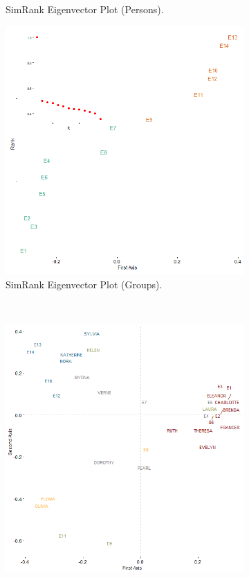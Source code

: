 \documentclass[a4paper,fleqn]{cas-sc}
\begin{document}
\begin{figure}
\begin{subfigure}[b]{0.3\textwidth}
            \caption{SimRank Eigenvector Plot (Persons).}
            \label{fig:g-bon-sim}
    \end{subfigure} 
     \begin{subfigure}[b]{0.3\textwidth}
        \includegraphics[width=1.0\textwidth]{Plots/g-sr-plot-eigen.png}
            \caption{SimRank Eigenvector Plot (Groups).}
            \label{fig:bon-corr}
    \end{subfigure} \\
     \begin{subfigure}[b]{0.55\textwidth}
        \includegraphics[width=1.0\textwidth]{Plots/sr-corr-plot.png}

\end{subfigure}
\end{figure}
\end{document}
